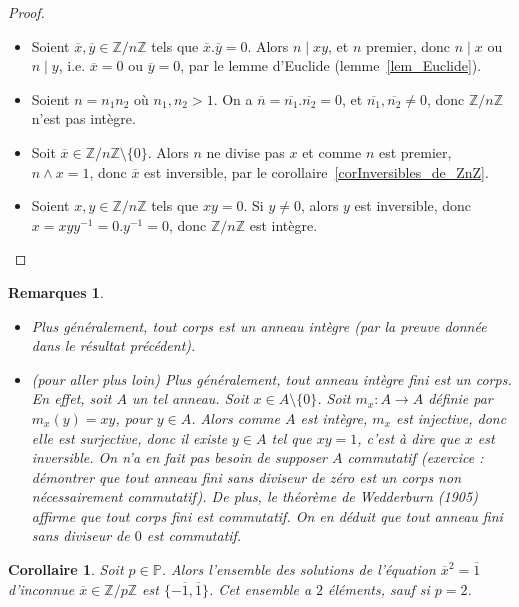 \documentclass[12pt]{report}
\newtheorem{remarques}[thm]{Remarques}
\newtheorem{Cor}[thm]{Corollaire}
\newcommand{\Z}{\mathbb{Z}}
\begin{document}
\begin{proof}\
\begin{itemize}
\item[« (1) $ \Rightarrow$ (2) »] Soient $\overline{x},\overline{y} \in \mathbb{Z}/n\mathbb{Z}$ tels que $\overline{x}.\overline{y}=0$. Alors $n \mid xy$, et $n$ premier, donc $n \mid x$ ou $n \mid y$, i.e. $\overline{x}=0$ ou $\overline{y}=0$, par le lemme d'Euclide (lemme~\ref{lem_Euclide}).
\item[« (2) $\Rightarrow$ (1) »] Soient $n=n_1 n_2$ où $n_1,n_2 >1$. On a $\overline{n}=\overline{n_1}.\overline{n_2}=0$, et $\overline{n_1},\overline{n_2}\neq 0$, donc $\mathbb{Z}/n\mathbb{Z}$ n'est pas intègre.
\item[« (1) $\Rightarrow$ (3) »] Soit $\overline{x} \in \mathbb{Z}/n \mathbb{Z}\setminus\{0\}$. Alors $n$ ne divise pas $x$ et comme $n$ est premier, $n\wedge x=1$, donc $\overline{x}$ est inversible, par le corollaire~\ref{corInversibles_de_ZnZ}.
\item[« (3) $\Rightarrow$ (2) »]    Soient $x,y \in \mathbb{Z}/n \mathbb{Z}$ tels que $xy=0$. Si $y \neq 0$, alors $y$ est inversible, donc $x=xyy^{-1}=0. y^{-1}=0$, donc $\mathbb{Z}/n\mathbb{Z}$ est intègre.
\end{itemize}
\end{proof}


\begin{remarques}
\begin{itemize}
\item[•] Plus généralement, tout corps est un anneau intègre (par la preuve donnée dans le résultat précédent).

\item[•] (pour aller plus loin) Plus généralement, tout anneau intègre fini est un corps. En effet, soit $A$ un tel anneau. Soit $x\in A\setminus \{ 0\}$. Soit $m_x:A\rightarrow A$ définie par $m_x(y)=xy$, pour $y\in A$. Alors comme $A$ est intègre, $m_x$ est injective, donc elle est surjective, donc il existe $y\in A$ tel que $xy=1$, c'est à dire que $x$ est inversible. On n'a en fait pas besoin de supposer $A$ commutatif (exercice : démontrer que tout anneau fini sans diviseur de zéro est un corps non nécessairement commutatif). De plus, le théorème de Wedderburn (1905) affirme que tout corps fini est commutatif. On en déduit que tout anneau fini sans diviseur de $0$ est commutatif.
\end{itemize}
\end{remarques}


\begin{Cor}\label{corRacines_carrées_moins_un}
Soit $p\in \mathbb{P}$. Alors l'ensemble des solutions de l'équation $\overline{x}^2 =\overline{1}$ d'inconnue $\overline{x}\in \Z/p\Z$ est $\{-\overline{1},\overline{1}\}$. Cet ensemble a $2$ éléments, sauf si $p=2$.
\end{Cor}
\end{document}
